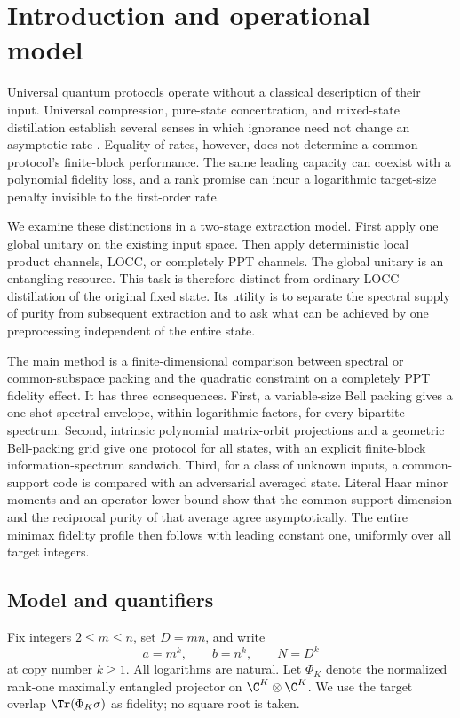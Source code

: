\section{Introduction and operational model}

Universal quantum protocols operate without a classical description of their input. Universal compression, pure-state concentration, and mixed-state distillation establish several senses in which ignorance need not change an asymptotic rate \cite{jhhh,hm,takagi,tirone,llf,rizzo}. Equality of rates, however, does not determine a common protocol's finite-block performance. The same leading capacity can coexist with a polynomial fidelity loss, and a rank promise can incur a logarithmic target-size penalty invisible to the first-order rate.

We examine these distinctions in a two-stage extraction model. First apply one global unitary on the existing input space. Then apply deterministic local product channels, LOCC, or completely PPT channels. The global unitary is an entangling resource. This task is therefore distinct from ordinary LOCC distillation of the original fixed state. Its utility is to separate the spectral supply of purity from subsequent extraction and to ask what can be achieved by one preprocessing independent of the entire state.

The main method is a finite-dimensional comparison between spectral or common-subspace packing and the quadratic constraint on a completely PPT fidelity effect. It has three consequences. First, a variable-size Bell packing gives a one-shot spectral envelope, within logarithmic factors, for every bipartite spectrum. Second, intrinsic polynomial matrix-orbit projections and a geometric Bell-packing grid give one protocol for all states, with an explicit finite-block information-spectrum sandwich. Third, for a class of unknown inputs, a common-support code is compared with an adversarial averaged state. Literal Haar minor moments and an operator lower bound show that the common-support dimension and the reciprocal purity of that average agree asymptotically. The entire minimax fidelity profile then follows with leading constant one, uniformly over all target integers.

\subsection{Model and quantifiers}
Fix integers $2\le m\le n$, set $D=mn$, and write
\[
 a=m^k,\qquad b=n^k,\qquad N=D^k
\]
at copy number $k\ge1$. All logarithms are natural. Let $\Phi_K$ denote the normalized rank-one maximally entangled projector on $\C^K\otimes\C^K$. We use the target overlap $\Tr(\Phi_K\sigma)$ as fidelity; no square root is taken.

